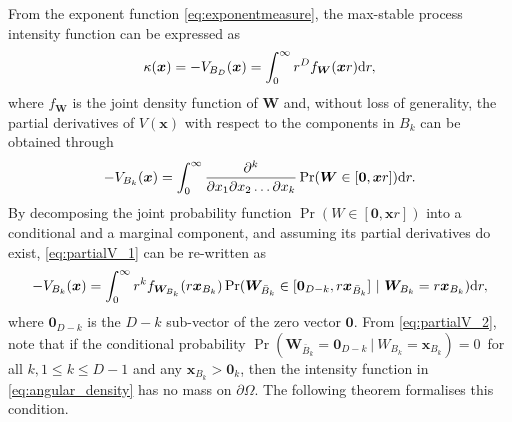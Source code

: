 \documentclass[12pt]{article}
\begin{document}
%
From the exponent function \eqref{eq:exponentmeasure}, the max-stable process intensity function can be expressed as 
\begin{equation}\label{eq:intensity}
	\kappa(\bm x) = -V_{B_D}(\bm x) = \int_0^\infty r^D f_{\bm W}(\bm xr)\text dr,
\end{equation} 
where $f_{\bm W}$ is the joint density function of $\bm W$ and, without loss of generality, the partial derivatives of $V(\bm x)$ with respect to the components in $B_k$ can be obtained through
%
\begin{equation}
\label{eq:partialV_1}
 -V_{B_k}(\bm x) = \int_0^\infty \frac{\partial^k}{\partial x_1\partial x_2\dots \partial x_k}\Pr(\bm W \in [\bm 0,\bm xr ])\text dr. 
\end{equation}
%
By decomposing the joint probability function $\Pr(W\in [\bm 0,\bm xr])$ into a conditional and a marginal component, and assuming its partial derivatives do exist, \eqref{eq:partialV_1} can be re-written as
%
\begin{equation}
\label{eq:partialV_2}
 -V_{B_k}(\bm x) = \int_0^\infty r^k f_{\bm W_{B_k}}(r \bm x_{B_k})  \Pr(\bm W_{\bar{B}_k} \in [\bm 0_{D-k},r \bm x_{\bar{B}_k} ]\ |\ \bm W_{B_k} = r \bm x_{B_k} )\text dr,
\end{equation}
%
where $\bm 0_{D-k}$ is the $D-k$ sub-vector of the zero vector $\bm 0$.
From \eqref{eq:partialV_2}, note that if the conditional probability $\Pr(\bm W_{\bar{B}_k} =\bm 0_{D-k}\ |\ W_{B_k} = \bm x_{B_k} )=0$\ for all $k, 1 \leq k \leq D-1$ and any $\bm x_{B_k} > \bm 0_k$, then the intensity function in \eqref{eq:angular_density} has no mass on $\partial\Omega$. The following theorem formalises this condition. 
%
\end{document}
